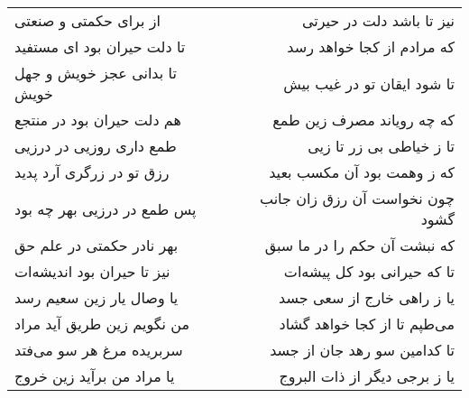 \begin{center}
\begin{longtable}{l p{0.5cm} r}
\\
از برای حکمتی و صنعتی
&&
نیز تا باشد دلت در حیرتی
\\
تا دلت حیران بود ای مستفید
&&
که مرادم از کجا خواهد رسد
\\
تا بدانی عجز خویش و جهل خویش
&&
تا شود ایقان تو در غیب بیش
\\
هم دلت حیران بود در منتجع
&&
که چه رویاند مصرف زین طمع
\\
طمع داری روزیی در درزیی
&&
تا ز خیاطی بی زر تا زیی
\\
رزق تو در زرگری آرد پدید
&&
که ز وهمت بود آن مکسب بعید
\\
پس طمع در درزیی بهر چه بود
&&
چون نخواست آن رزق زان جانب گشود
\\
بهر نادر حکمتی در علم حق
&&
که نبشت آن حکم را در ما سبق
\\
نیز تا حیران بود اندیشه‌ات
&&
تا که حیرانی بود کل پیشه‌ات
\\
یا وصال یار زین سعیم رسد
&&
یا ز راهی خارج از سعی جسد
\\
من نگویم زین طریق آید مراد
&&
می‌طپم تا از کجا خواهد گشاد
\\
سربریده مرغ هر سو می‌فتد
&&
تا کدامین سو رهد جان از جسد
\\
یا مراد من برآید زین خروج
&&
یا ز برجی دیگر از ذات البروج
\\
\end{longtable}
\end{center}
